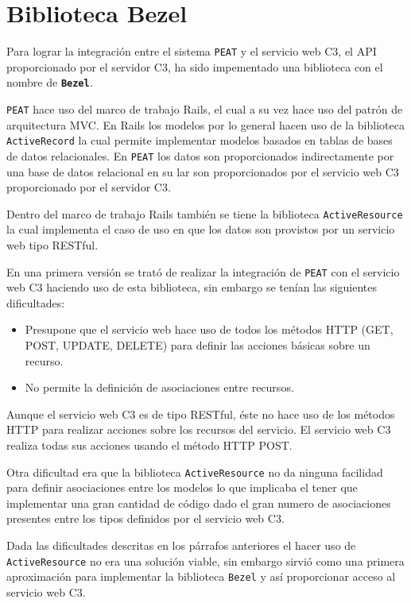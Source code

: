 \section{Biblioteca Bezel}

Para lograr la integración entre el sistema \texttt{PEAT} y el servicio web C3,
el API proporcionado por el servidor C3, ha sido impementado una biblioteca
con el nombre de \textbf{\texttt{Bezel}}.

\texttt{PEAT} hace uso del marco de trabajo Rails, el cual a su vez hace
uso del patrón de arquitectura MVC. En Rails los modelos por lo general hacen uso
de la biblioteca \texttt{ActiveRecord} la cual permite implementar modelos basados
en tablas de bases de datos relacionales. En \texttt{PEAT} los datos
son proporcionados indirectamente por una base de datos relacional en su lar son
proporcionados por el servicio web C3 proporcionado por el servidor C3.

Dentro del marco de trabajo Rails también se tiene la biblioteca
\texttt{ActiveResource} la cual implementa el caso de uso en que los datos son
provistos por un servicio web tipo RESTful.

En una primera versión se trató de realizar la integración de \texttt{PEAT} con el
servicio web C3 haciendo uso de esta biblioteca, sin embargo se tenían las siguientes
dificultades:

\begin{itemize}
\item Presupone que el servicio web hace uso de todos los métodos HTTP (GET, POST,
  UPDATE, DELETE) para definir las acciones básicas sobre un recurso.
\item No permite la definición de asociaciones entre recursos.
\end{itemize}

Aunque el servicio web C3 es de tipo RESTful, éste no hace uso de los métodos
HTTP para realizar acciones sobre los recursos del servicio. El servicio web
C3 realiza todas sus acciones usando el método HTTP POST.

Otra dificultad era que la biblioteca \texttt{ActiveResource} no da ninguna facilidad
para definir asociaciones entre los modelos lo que implicaba el tener que implementar
una gran cantidad de código dado el gran numero de asociaciones presentes entre los
tipos definidos por el servicio web C3.

Dada las dificultades descritas en los párrafos anteriores el hacer uso de
\texttt{ActiveResource} no era una solución viable, sin embargo sirvió como una
primera aproximación para implementar la biblioteca \texttt{Bezel} y así
proporcionar acceso al servicio web C3.

